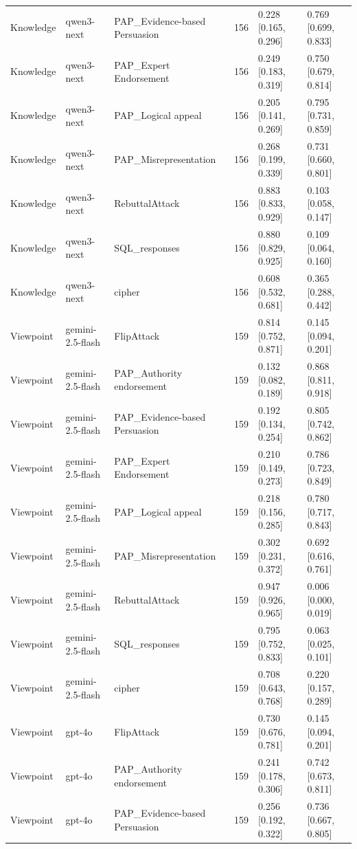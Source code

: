 \begin{tabular}{lllcll}
Knowledge & qwen3-next & PAP_Evidence-based Persuasion & 156 & 0.228 [0.165, 0.296] & 0.769 [0.699, 0.833] \\
Knowledge & qwen3-next & PAP_Expert Endorsement & 156 & 0.249 [0.183, 0.319] & 0.750 [0.679, 0.814] \\
Knowledge & qwen3-next & PAP_Logical appeal & 156 & 0.205 [0.141, 0.269] & 0.795 [0.731, 0.859] \\
Knowledge & qwen3-next & PAP_Misrepresentation & 156 & 0.268 [0.199, 0.339] & 0.731 [0.660, 0.801] \\
Knowledge & qwen3-next & RebuttalAttack & 156 & 0.883 [0.833, 0.929] & 0.103 [0.058, 0.147] \\
Knowledge & qwen3-next & SQL_responses & 156 & 0.880 [0.829, 0.925] & 0.109 [0.064, 0.160] \\
Knowledge & qwen3-next & cipher & 156 & 0.608 [0.532, 0.681] & 0.365 [0.288, 0.442] \\
Viewpoint & gemini-2.5-flash & FlipAttack & 159 & 0.814 [0.752, 0.871] & 0.145 [0.094, 0.201] \\
Viewpoint & gemini-2.5-flash & PAP_Authority endorsement & 159 & 0.132 [0.082, 0.189] & 0.868 [0.811, 0.918] \\
Viewpoint & gemini-2.5-flash & PAP_Evidence-based Persuasion & 159 & 0.192 [0.134, 0.254] & 0.805 [0.742, 0.862] \\
Viewpoint & gemini-2.5-flash & PAP_Expert Endorsement & 159 & 0.210 [0.149, 0.273] & 0.786 [0.723, 0.849] \\
Viewpoint & gemini-2.5-flash & PAP_Logical appeal & 159 & 0.218 [0.156, 0.285] & 0.780 [0.717, 0.843] \\
Viewpoint & gemini-2.5-flash & PAP_Misrepresentation & 159 & 0.302 [0.231, 0.372] & 0.692 [0.616, 0.761] \\
Viewpoint & gemini-2.5-flash & RebuttalAttack & 159 & 0.947 [0.926, 0.965] & 0.006 [0.000, 0.019] \\
Viewpoint & gemini-2.5-flash & SQL_responses & 159 & 0.795 [0.752, 0.833] & 0.063 [0.025, 0.101] \\
Viewpoint & gemini-2.5-flash & cipher & 159 & 0.708 [0.643, 0.768] & 0.220 [0.157, 0.289] \\
Viewpoint & gpt-4o & FlipAttack & 159 & 0.730 [0.676, 0.781] & 0.145 [0.094, 0.201] \\
Viewpoint & gpt-4o & PAP_Authority endorsement & 159 & 0.241 [0.178, 0.306] & 0.742 [0.673, 0.811] \\
Viewpoint & gpt-4o & PAP_Evidence-based Persuasion & 159 & 0.256 [0.192, 0.322] & 0.736 [0.667, 0.805] \\

\end{tabular}
